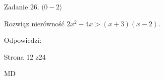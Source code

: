 \documentclass[a4paper,12pt]{article}
\begin{document}
Zadanie 26. $(0-2\rangle$

Rozwiąz nierówność $2x^{2}-4x>(x+3)(x-2).$

Odpowiedzí:

Strona 12 z24

MD
\end{document}
